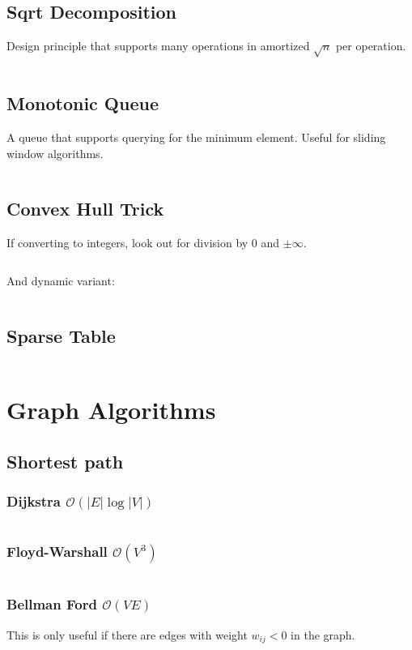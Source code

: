 \documentclass[8pt,a4paper,landscape,oneside]{amsart}
\newcommand{\mintedstyle}[2]{\inputminted[fontsize=\normalsize,baselinestretch=.9,breaklines,tabsize=2]{#1}{code/#2}}
\newcommand{\code}[1]{\mintedstyle{cpp}{#1}}
\begin{document}
\begin{multicols*}{3}
\subsection{Sqrt Decomposition}
Design principle that supports many operations in amortized $\sqrt{n}$ per operation.
\code{datastructures/sqrt_decomposition.cpp}

\subsection{Monotonic Queue}
A queue that supports querying for the minimum element. Useful for sliding window algorithms.
\code{datastructures/monotonic_queue.cpp}

\subsection{Convex Hull Trick}
If converting to integers, look out for division by 0 and $\pm\infty$.
\code{datastructures/convex_hull_trick.cpp}
And dynamic variant:
\code{datastructures/convex_hull_trick_dynamic.cpp}

\subsection{Sparse Table}
\code{datastructures/sparse_table.cpp}

\section{Graph Algorithms}

\subsection{Shortest path}

\subsubsection{Dijkstra $\mathcal{O}(|E|\log{|V|})$}
\code{graphs/dijkstra.cpp}

\subsubsection{Floyd-Warshall $\mathcal{O}(V^{3})$}
\code{graphs/floydwarshall.cpp}

\subsubsection{Bellman Ford $\mathcal{O}(V E)$}
This is only useful if there are edges with weight $w_{i j} < 0$ in the graph.
\code{graphs/bellmanford.cpp}


\end{multicols*}
\end{document}
